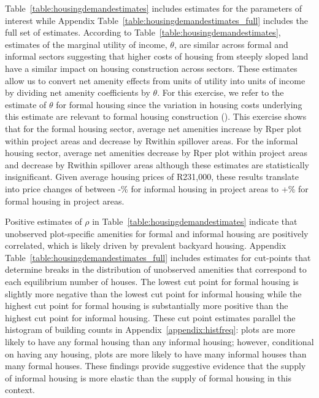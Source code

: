 \documentclass[12pt]{article}
\begin{document}
Table~\ref{table:housingdemandestimates} includes estimates for the parameters of interest while Appendix Table~\ref{table:housingdemandestimates_full} includes the full set of estimates.  According to Table~\ref{table:housingdemandestimates}, estimates of the marginal utility of income, $\theta$, are similar across formal and informal sectors suggesting that higher costs of housing from steeply sloped land have a similar impact on housing construction across sectors.  These estimates allow us to convert net amenity effects from units of utility into units of income by dividing net amenity coefficients by $\theta$.  For this exercise, we refer to the estimate of $\theta$ for formal housing since the variation in housing costs underlying this estimate are relevant to formal housing construction (\cite{redbook}).  This exercise shows that for the formal housing sector, average net amenities increase by Rper plot within project areas and decrease by Rwithin spillover areas.  For the informal housing sector, average net amenities decrease by Rper plot within project areas and decrease by Rwithin spillover areas although these estimates are statistically insignificant.  Given average housing prices of R231,000, these results translate into price changes of between -\unskip\% for informal housing in project areas to +\unskip\% for formal housing in project areas.  

Positive estimates of $\rho$ in Table~\ref{table:housingdemandestimates} indicate that unobserved plot-specific amenities for formal and informal housing are positively correlated, which is likely driven by prevalent backyard housing.  Appendix Table~\ref{table:housingdemandestimates_full} includes estimates for cut-points that determine breaks in the distribution of unobserved amenities that correspond to each equilibrium number of houses.  The lowest cut point for formal housing is slightly more negative than the lowest cut point for informal housing while the highest cut point for formal housing is substantially more positive than the highest cut point for informal housing.  These cut point estimates parallel the histogram of building counts in Appendix~\ref{appendix:histfreq}:  plots are more likely to have any formal housing than any informal housing; however, conditional on having any housing, plots are more likely to have many informal houses than many formal houses.  These findings provide suggestive evidence that the supply of informal housing is more elastic than the supply of formal housing in this context.
\end{document}
